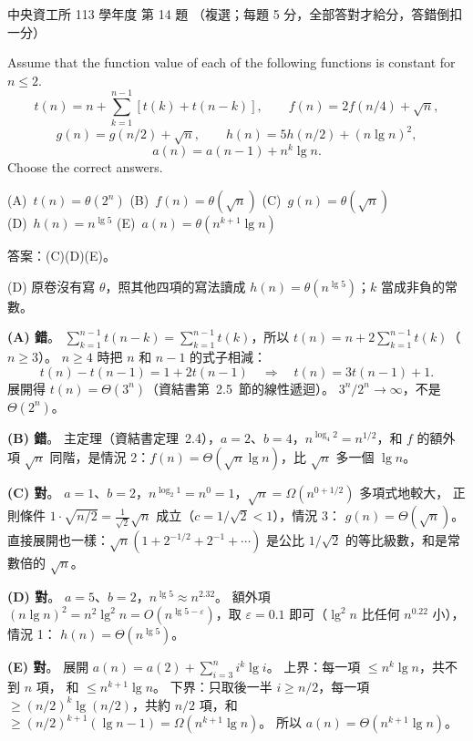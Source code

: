 \begin{pastexam}[label={px:ncu-113-dsa-14}]{中央資工所 113 學年度 第 14 題}
（複選；每題 5 分，全部答對才給分，答錯倒扣一分）

Assume that the function value of each of the following functions is constant for $n\le 2$.
\[
t(n)=n+\sum_{k=1}^{n-1}[t(k)+t(n-k)],\qquad f(n)=2f(n/4)+\sqrt{n},
\]
\[
g(n)=g(n/2)+\sqrt{n},\qquad h(n)=5h(n/2)+(n\lg n)^2,
\]
\[
a(n)=a(n-1)+n^k\lg n.
\]
Choose the correct answers.

(A)~$t(n)=\theta(2^n)$ \quad (B)~$f(n)=\theta(\sqrt{n})$ \quad (C)~$g(n)=\theta(\sqrt{n})$\\
(D)~$h(n)=n^{\lg 5}$ \quad (E)~$a(n)=\theta(n^{k+1}\lg n)$
\end{pastexam}

\begin{pastsoln}
答案：(C)(D)(E)。

(D) 原卷沒有寫 $\theta$，照其他四項的寫法讀成 $h(n) = \theta(n^{\lg 5})$；$k$ 當成非負的常數。

\textbf{(A) 錯}。 $\sum_{k=1}^{n-1} t(n-k) = \sum_{k=1}^{n-1} t(k)$，所以
$t(n) = n + 2\sum_{k=1}^{n-1} t(k)$（$n \ge 3$）。 $n \ge 4$ 時把 $n$ 和 $n-1$ 的式子相減：
\[
t(n) - t(n-1) = 1 + 2t(n-1) \quad\Longrightarrow\quad t(n) = 3t(n-1) + 1 .
\]
展開得 $t(n) = \Theta(3^n)$（資結書第~2.5~節的線性遞迴）。 $3^n / 2^n \to \infty$，不是 $\Theta(2^n)$。

\textbf{(B) 錯}。 主定理（資結書定理~2.4），$a = 2$、$b = 4$，$n^{\log_4 2} = n^{1/2}$，和 $f$ 的額外項
$\sqrt n$ 同階，是情況 2：$f(n) = \Theta(\sqrt n\lg n)$，比 $\sqrt n$ 多一個 $\lg n$。

\textbf{(C) 對}。 $a = 1$、$b = 2$，$n^{\log_2 1} = n^0 = 1$，$\sqrt n = \Omega(n^{0 + 1/2})$ 多項式地較大，
正則條件 $1 \cdot \sqrt{n/2} = \tfrac{1}{\sqrt 2}\sqrt n$ 成立（$c = 1/\sqrt2 < 1$），情況 3：
$g(n) = \Theta(\sqrt n)$。 直接展開也一樣：$\sqrt n(1 + 2^{-1/2} + 2^{-1} + \cdots)$ 是公比
$1/\sqrt2$ 的等比級數，和是常數倍的 $\sqrt n$。

\textbf{(D) 對}。 $a = 5$、$b = 2$，$n^{\lg 5} \approx n^{2.32}$。 額外項 $(n\lg n)^2 = n^2\lg^2 n =
O(n^{\lg 5 - \varepsilon})$，取 $\varepsilon = 0.1$ 即可（$\lg^2 n$ 比任何 $n^{0.22}$ 小），情況 1：
$h(n) = \Theta(n^{\lg 5})$。

\textbf{(E) 對}。 展開 $a(n) = a(2) + \sum_{i=3}^{n} i^k\lg i$。 上界：每一項 $\le n^k\lg n$，共不到 $n$ 項，
和 $\le n^{k+1}\lg n$。 下界：只取後一半 $i \ge n/2$，每一項 $\ge (n/2)^k\lg(n/2)$，共約 $n/2$ 項，和
$\ge (n/2)^{k+1}(\lg n - 1) = \Omega(n^{k+1}\lg n)$。 所以 $a(n) = \Theta(n^{k+1}\lg n)$。
\end{pastsoln}
